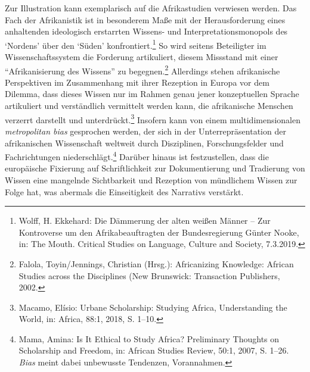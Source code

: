 \documentclass[a4paper,
fontsize=11pt,
oneside,
numbers=noperiodatend,
parskip=half-,
bibliography=totoc,
final
]{scrartcl}
\begin{document}
Zur Illustration kann exemplarisch auf die Afrikastudien verwiesen
werden. Das Fach der Afrikanistik ist in besonderem Maße mit der
Herausforderung eines anhaltenden ideologisch erstarrten Wissens- und
Interpretationsmonopols des \enquote*{Nordens} über den \enquote*{Süden}
konfrontiert.\footnote{Wolff, H. Ekkehard: Die Dämmerung der alten
  weißen Männer -- Zur Kontroverse um den Afrikabeauftragten der
  Bundesregierung Günter Nooke, in: The Mouth. Critical Studies on
  Language, Culture and Society, 7.3.2019.} So wird seitens Beteiligter
im Wissenschaftssystem die Forderung artikuliert, diesem Missstand mit
einer \enquote{Afrikanisierung des Wissens} zu begegnen.\footnote{Falola,
  Toyin/Jennings, Christian (Hrsg.): Africanizing Knowledge: African
  Studies across the Disciplines (New Brunswick: Transaction Publishers,
  2002.} Allerdings stehen afrikanische Perspektiven im Zusammenhang mit
ihrer Rezeption in Europa vor dem Dilemma, dass dieses Wissen nur im
Rahmen genau jener konzeptuellen Sprache artikuliert und verständlich
vermittelt werden kann, die afrikanische Menschen verzerrt darstellt und
unterdrückt.\footnote{Macamo, Elísio: Urbane Scholarship: Studying
  Africa, Understanding the World, in: Africa, 88:1, 2018, S. 1--10.}
Insofern kann von einem multidimensionalen \emph{metropolitan bias}
gesprochen werden, der sich in der Unterrepräsentation der afrikanischen
Wissenschaft weltweit durch Disziplinen, Forschungsfelder und
Fachrichtungen niederschlägt.\footnote{Mama, Amina: Is It Ethical to
  Study Africa? Preliminary Thoughts on Scholarship and Freedom, in:
  African Studies Review, 50:1, 2007, S. 1--26. \emph{Bias} meint dabei
  unbewusste Tendenzen, Vorannahmen.} Darüber hinaus ist festzustellen,
dass die europäische Fixierung auf Schriftlichkeit zur Dokumentierung
und Tradierung von Wissen eine mangelnde Sichtbarkeit und Rezeption von
mündlichem Wissen zur Folge hat, was abermals die Einseitigkeit des
Narrativs verstärkt.
\end{document}
